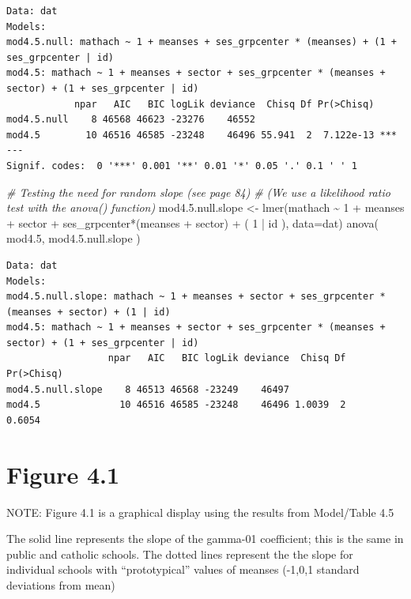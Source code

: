 \documentclass[
  letterpaper,
  DIV=11,
  numbers=noendperiod]{scrreprt}
\newenvironment{Shaded}{}{}
\newcommand{\AttributeTok}[1]{\textcolor[rgb]{0.49,0.56,0.16}{#1}}
\newcommand{\CommentTok}[1]{\textcolor[rgb]{0.38,0.63,0.69}{\textit{#1}}}
\newcommand{\DecValTok}[1]{\textcolor[rgb]{0.25,0.63,0.44}{#1}}
\newcommand{\FloatTok}[1]{\textcolor[rgb]{0.25,0.63,0.44}{#1}}
\newcommand{\FunctionTok}[1]{\textcolor[rgb]{0.02,0.16,0.49}{#1}}
\newcommand{\NormalTok}[1]{#1}
\newcommand{\OtherTok}[1]{\textcolor[rgb]{0.00,0.44,0.13}{#1}}
\newcommand{\SpecialCharTok}[1]{\textcolor[rgb]{0.25,0.44,0.63}{#1}}
\begin{document}
\begin{verbatim}
Data: dat
Models:
mod4.5.null: mathach ~ 1 + meanses + ses_grpcenter * (meanses) + (1 + ses_grpcenter | id)
mod4.5: mathach ~ 1 + meanses + sector + ses_grpcenter * (meanses + sector) + (1 + ses_grpcenter | id)
            npar   AIC   BIC logLik deviance  Chisq Df Pr(>Chisq)    
mod4.5.null    8 46568 46623 -23276    46552                         
mod4.5        10 46516 46585 -23248    46496 55.941  2  7.122e-13 ***
---
Signif. codes:  0 '***' 0.001 '**' 0.01 '*' 0.05 '.' 0.1 ' ' 1
\end{verbatim}

\begin{Shaded}
\begin{Highlighting}[]
\CommentTok{\# Testing the need for random slope  (see page 84)}
\CommentTok{\# (We use a likelihood ratio test with the anova() function)}
\NormalTok{mod4.}\FloatTok{5.}\NormalTok{null.slope }\OtherTok{\textless{}{-}} \FunctionTok{lmer}\NormalTok{(mathach }\SpecialCharTok{\textasciitilde{}} \DecValTok{1} \SpecialCharTok{+}\NormalTok{ meanses }\SpecialCharTok{+}\NormalTok{ sector }\SpecialCharTok{+}\NormalTok{ ses\_grpcenter}\SpecialCharTok{*}\NormalTok{(meanses }\SpecialCharTok{+}\NormalTok{ sector) }\SpecialCharTok{+}\NormalTok{ ( }\DecValTok{1} \SpecialCharTok{|}\NormalTok{ id ), }\AttributeTok{data=}\NormalTok{dat) }
\FunctionTok{anova}\NormalTok{( mod4}\FloatTok{.5}\NormalTok{, mod4.}\FloatTok{5.}\NormalTok{null.slope )}
\end{Highlighting}
\end{Shaded}

\begin{verbatim}
Data: dat
Models:
mod4.5.null.slope: mathach ~ 1 + meanses + sector + ses_grpcenter * (meanses + sector) + (1 | id)
mod4.5: mathach ~ 1 + meanses + sector + ses_grpcenter * (meanses + sector) + (1 + ses_grpcenter | id)
                  npar   AIC   BIC logLik deviance  Chisq Df Pr(>Chisq)
mod4.5.null.slope    8 46513 46568 -23249    46497                     
mod4.5              10 46516 46585 -23248    46496 1.0039  2     0.6054
\end{verbatim}

\section{Figure 4.1}\label{figure-4.1}

NOTE: Figure 4.1 is a graphical display using the results from
Model/Table 4.5

The solid line represents the slope of the gamma-01 coefficient; this is
the same in public and catholic schools. The dotted lines represent the
the slope for individual schools with ``prototypical'' values of meanses
(-1,0,1 standard deviations from mean)
\end{document}
